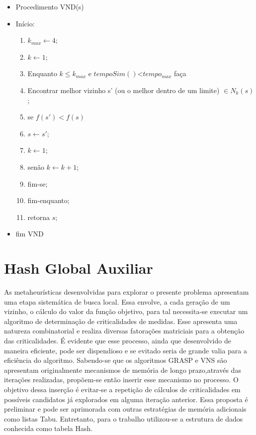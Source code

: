 \documentclass[12pt]{article}
\begin{document}
\begin{itemize}
	\item Procedimento VND(s) 
	\item Início:
	\begin{enumerate}
		\item $k_{max} \leftarrow 4$; 
		\item $k \leftarrow 1$;
		\item Enquanto $k \leq k_{max}$ e $tempoSim()$<$tempo_{max}$ faça
		\item \quad Encontrar melhor vizinho s' (ou o melhor dentro de um limite) $\in N_k(s)$; 
		\item \quad se $f(s') < f(s)$
		\item \qquad  $s \leftarrow s'$;
		\item \qquad  $k \leftarrow 1$;
		\item \quad senão $k \leftarrow k + 1$;
		\item \quad fim-se;
		\item fim-enquanto;
		\item retorna $s$;
	\end{enumerate}	
	\item fim VND
\end{itemize}



\section{Hash Global Auxiliar}
As metaheurísticas desenvolvidas para explorar o presente problema apresentam uma etapa sistemática de busca local. Essa envolve, a cada geração de um vizinho, o cálculo do valor da função objetivo, para tal necessita-se executar um algoritmo de determinação de criticalidades de medidas. Esse apresenta uma natureza combinatorial e realiza diversas fatorações matriciais para a obtenção das criticalidades. É evidente que esse processo, ainda que desenvolvido de maneira eficiente, pode ser dispendioso e se evitado seria de grande valia para a eficiência do algoritmo. Sabendo-se que os algoritmos GRASP e VNS são apresentam originalmente mecanismos de memória de longo prazo,através das iterações realizadas, propõem-se então inserir esse mecanismo no processo. O objetivo dessa inserção é evitar-se a repetição de cálculos de criticalidades em possíveis candidatos já explorados em alguma iteração anterior. Essa proposta é preliminar e pode ser aprimorada com outras estratégias de memória adicionais como listas Tabu. Entretanto, para o trabalho utilizou-se a estrutura de dados conhecida como tabela Hash.
\end{document}
